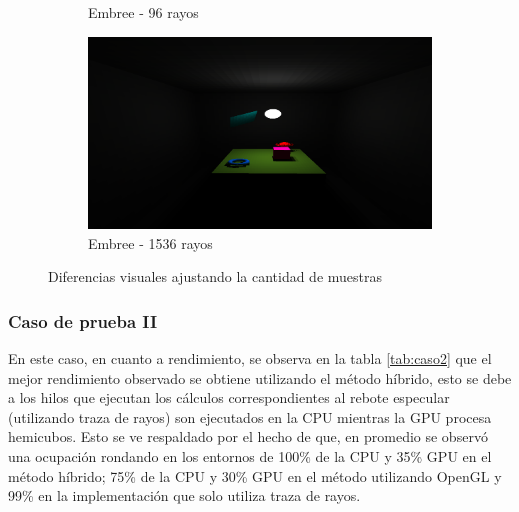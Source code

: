 \begin{figure}[htbp]
\begin{subfigure}{0.45\textwidth}
		\caption{Embree - 96 rayos}
	\end{subfigure}
	\begin{subfigure}{0.45\textwidth}
		\includegraphics[width=1\linewidth]{assets/512srt}
		\caption{Embree - 1536 rayos}
	\end{subfigure}
	\caption{Diferencias visuales ajustando la cantidad de muestras}
	\label{img:difres}
\end{figure}

\subsubsection{Caso de prueba II}

En este caso, en cuanto a rendimiento, se observa en la tabla \ref{tab:caso2} que el mejor rendimiento observado se obtiene utilizando el método híbrido, esto se debe a los hilos que ejecutan los cálculos correspondientes al rebote especular (utilizando traza de rayos) son ejecutados en la CPU mientras la GPU procesa hemicubos. Esto se ve respaldado por el hecho de que, en promedio se observó una ocupación rondando en los entornos de 100\% de la CPU y 35\% GPU en el método híbrido; 75\% de la CPU y 30\% GPU en el método utilizando OpenGL y 99\% en la implementación que solo utiliza traza de rayos. 


